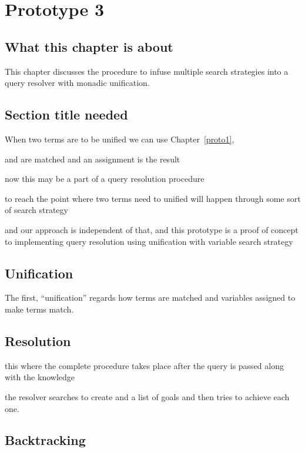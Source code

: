 \documentclass[thesis-solanki.tex]{files}
\begin{document}
\chapter{Prototype 3}{\label{proto3}}


\section{What this chapter is about}
This chapter discusses the procedure to infuse multiple search strategies into a  query resolver with monadic unification. 



\section{Section title needed}
When two terms are to be unified we can use Chapter~\ref{proto1},

 and  are matched and an assignment is the result 

now this may be a part of a query resolution procedure

to reach the point where two terms need to unified will happen through some sort of search strategy

and our approach is independent of that, and this prototype is a proof of concept to implementing query resolution using unification with
variable search strategy


\section{Unification}
The first, ``unification'' regards how terms are matched and variables assigned to make terms
match.
\cite{website:prologunification}



\section{Resolution}
this where the complete procedure takes place after the query is passed along with the knowledge 

the resolver searches to create and a list of  goals and then tries to achieve each one.

\cite{website:prologresolution}

\cite{website:resolutionlogicwiki}


\section{Backtracking}
\end{document}
